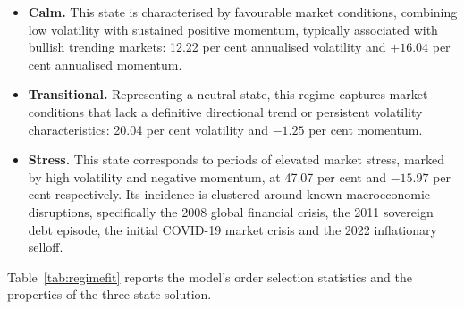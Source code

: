 \begin{itemize}
\item \textbf{Calm.} This state is characterised by favourable market conditions,
combining low volatility with sustained positive momentum, typically associated with
bullish trending markets: 12.22 per cent annualised volatility and $+16.04$ per cent
annualised momentum.
\item \textbf{Transitional.} Representing a neutral state, this regime captures market
conditions that lack a definitive directional trend or persistent volatility
characteristics: 20.04 per cent volatility and $-1.25$ per cent momentum.
\item \textbf{Stress.} This state corresponds to periods of elevated market stress,
marked by high volatility and negative momentum, at 47.07 per cent and $-15.97$ per cent
respectively. Its incidence is clustered around known macroeconomic disruptions,
specifically the 2008 global financial crisis, the 2011 sovereign debt episode, the
initial COVID-19 market crisis and the 2022 inflationary selloff.
\end{itemize}

Table~\ref{tab:regimefit} reports the model's order selection statistics and the
properties of the three-state solution.

